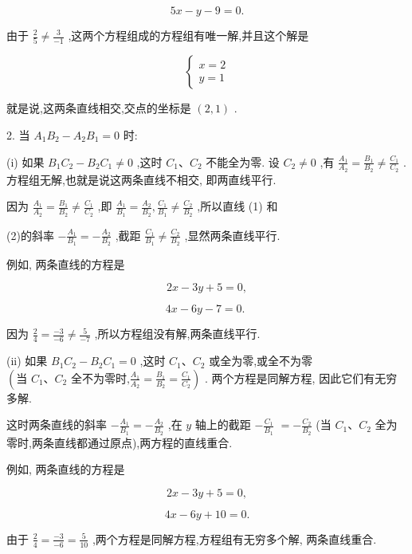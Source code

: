 \documentclass[lang=cn,newtx,12pt,scheme=chinese]{elegantbook}
\begin{document}
\[
    {5x} - y - 9 = 0.
\]

由于 \(\frac{2}{5} \neq \frac{3}{-1}\) ,这两个方程组成的方程组有唯一解,并且这个解是

\[
  \left\{ \begin{array}{l} x = 2 \\ y = 1 \end{array}\right.
\]

就是说,这两条直线相交,交点的坐标是 \(\left( {2,1}\right)\) .

2. 当 \({A}_{1}{B}_{2} - {A}_{2}{B}_{1} = 0\) 时:

(i) 如果 \({B}_{1}{C}_{2} - {B}_{2}{C}_{1} \neq 0\) ,这时 \({C}_{1}\text{、}{C}_{2}\) 不能全为零. 设 \({C}_{2} \neq 0\) ,有 \(\frac{{A}_{1}}{{A}_{2}} = \frac{{B}_{1}}{{B}_{2}} \neq \frac{{C}_{1}}{{C}_{2}}\) . 方程组无解,也就是说这两条直线不相交, 即两直线平行.

因为 \(\frac{{A}_{1}}{{A}_{2}} = \frac{{B}_{1}}{{B}_{2}} \neq \frac{{C}_{1}}{{C}_{2}}\) ,即 \(\frac{{A}_{1}}{{B}_{1}} = \frac{{A}_{2}}{{B}_{2}},\frac{{C}_{1}}{{B}_{1}} \neq \frac{{C}_{2}}{{B}_{2}}\) ,所以直线 (1) 和

(2)的斜率 \(- \frac{{A}_{1}}{{B}_{1}} = - \frac{{A}_{2}}{{B}_{2}}\) ,截距 \(\frac{{C}_{1}}{{B}_{1}} \neq \frac{{C}_{2}}{{B}_{2}}\) ,显然两条直线平行.

例如, 两条直线的方程是

\[
    {2x} - {3y} + 5 = 0,
\]

\[
    {4x} - {6y} - 7 = 0\text{. }
\]

因为 \(\frac{2}{4} = \frac{-3}{-6} \neq \frac{5}{-7}\) ,所以方程组没有解,两条直线平行.

(ii) 如果 \({B}_{1}{C}_{2} - {B}_{2}{C}_{1} = 0\) ,这时 \({C}_{1}\text{、}{C}_{2}\) 或全为零,或全不为零 \(\left( {\text{当 }{C}_{1}\text{、}{C}_{2}\text{ 全不为零时,}\frac{{A}_{1}}{{A}_{2}} = \frac{{B}_{1}}{{B}_{2}} = \frac{{C}_{1}}{{C}_{2}}}\right)\) . 两个方程是同解方程, 因此它们有无穷多解.

这时两条直线的斜率 \(- \frac{{A}_{1}}{{B}_{1}} = - \frac{{A}_{2}}{{B}_{2}}\) ,在 \(y\) 轴上的截距 \(- \frac{{C}_{1}}{{B}_{1}}\) \(= - \frac{{C}_{2}}{{B}_{2}}\) (当 \({C}_{1}\text{、}{C}_{2}\) 全为零时,两条直线都通过原点),两方程的直线重合.

例如, 两条直线的方程是

\[
    {2x} - {3y} + 5 = 0,
\]

\[
    {4x} - {6y} + {10} = 0.
\]

由于 \(\frac{2}{4} = \frac{-3}{-6} = \frac{5}{10}\) ,两个方程是同解方程,方程组有无穷多个解, 两条直线重合.
\end{document}
